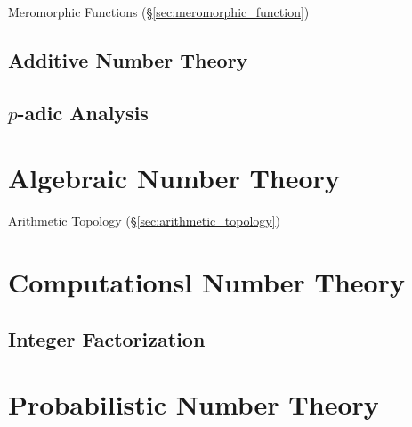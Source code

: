 Meromorphic Functions (\S\ref{sec:meromorphic_function})



\subsection{Additive Number Theory}\label{sec:additive_number_theory}

\subsection{$p$-adic Analysis}\label{sec:padic_analysis}



\section{Algebraic Number Theory}\label{sec:algebraic_number_theory}

Arithmetic Topology (\S\ref{sec:arithmetic_topology})



\section{Computationsl Number Theory}\label{sec:computational_number_theory}

\subsection{Integer Factorization}\label{sec:integer_factorization}



\section{Probabilistic Number Theory}\label{sec:probabilistic_number_theory}

